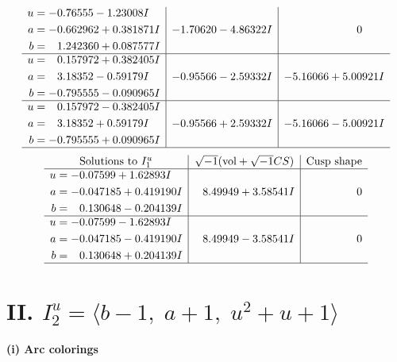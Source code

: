 \documentclass[1p]{elsarticle_modified}
\theoremstyle{definition}
\newcommand{\I}{\sqrt{-1}}
\begin{document}
$$\begin{array}{c|c|c}
\begin{aligned}
u &= -0.76555 - 1.23008 I \\
a &= -0.662962 + 0.381871 I \\
b &= \phantom{-}1.242360 + 0.087577 I\end{aligned}
 & -1.70620 - 4.86322 I & \phantom{-0.000000 } 0 \\ \hline\begin{aligned}
u &= \phantom{-}0.157972 + 0.382405 I \\
a &= \phantom{-}3.18352 - 0.59179 I \\
b &= -0.795555 - 0.090965 I\end{aligned}
 & -0.95566 - 2.59332 I & -5.16066 + 5.00921 I \\ \hline\begin{aligned}
u &= \phantom{-}0.157972 - 0.382405 I \\
a &= \phantom{-}3.18352 + 0.59179 I \\
b &= -0.795555 + 0.090965 I\end{aligned}
 & -0.95566 + 2.59332 I & -5.16066 - 5.00921 I\\
 \hline 
 \end{array}$$\newpage$$\begin{array}{c|c|c}  
\text{Solutions to }I^u_{1}& \I (\text{vol} + \sqrt{-1}CS) & \text{Cusp shape}\\
 \hline 
\begin{aligned}
u &= -0.07599 + 1.62893 I \\
a &= -0.047185 + 0.419190 I \\
b &= \phantom{-}0.130648 - 0.204139 I\end{aligned}
 & \phantom{-}8.49949 + 3.58541 I & \phantom{-0.000000 } 0 \\ \hline\begin{aligned}
u &= -0.07599 - 1.62893 I \\
a &= -0.047185 - 0.419190 I \\
b &= \phantom{-}0.130648 + 0.204139 I\end{aligned}
 & \phantom{-}8.49949 - 3.58541 I & \phantom{-0.000000 } 0\\
 \hline 
 \end{array}$$\newpage\newpage\renewcommand{\arraystretch}{1}
\centering \section*{II. $I^u_{2}= \langle b-1,\;a+1,\;u^2+u+1 \rangle$}
\flushleft \textbf{(i) Arc colorings}\\
\end{document}
